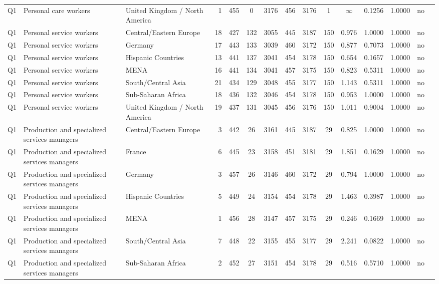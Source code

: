 \begin{longtable}{lllrcccccccccll}
Q1 & Personal care workers & United Kingdom / North America & 1 & 455 & 0 & 3176 & 456 & 3176 & 1 & $\infty$ & 0.1256 & 1.0000 & no \\
Q1 & Personal service workers & Central/Eastern Europe & 18 & 427 & 132 & 3055 & 445 & 3187 & 150 & 0.976 & 1.0000 & 1.0000 & no \\
Q1 & Personal service workers & Germany & 17 & 443 & 133 & 3039 & 460 & 3172 & 150 & 0.877 & 0.7073 & 1.0000 & no \\
Q1 & Personal service workers & Hispanic Countries & 13 & 441 & 137 & 3041 & 454 & 3178 & 150 & 0.654 & 0.1657 & 1.0000 & no \\
Q1 & Personal service workers & MENA & 16 & 441 & 134 & 3041 & 457 & 3175 & 150 & 0.823 & 0.5311 & 1.0000 & no \\
Q1 & Personal service workers & South/Central Asia & 21 & 434 & 129 & 3048 & 455 & 3177 & 150 & 1.143 & 0.5311 & 1.0000 & no \\
Q1 & Personal service workers & Sub-Saharan Africa & 18 & 436 & 132 & 3046 & 454 & 3178 & 150 & 0.953 & 1.0000 & 1.0000 & no \\
Q1 & Personal service workers & United Kingdom / North America & 19 & 437 & 131 & 3045 & 456 & 3176 & 150 & 1.011 & 0.9004 & 1.0000 & no \\
Q1 & Production and specialized services managers & Central/Eastern Europe & 3 & 442 & 26 & 3161 & 445 & 3187 & 29 & 0.825 & 1.0000 & 1.0000 & no \\
Q1 & Production and specialized services managers & France & 6 & 445 & 23 & 3158 & 451 & 3181 & 29 & 1.851 & 0.1629 & 1.0000 & no \\
Q1 & Production and specialized services managers & Germany & 3 & 457 & 26 & 3146 & 460 & 3172 & 29 & 0.794 & 1.0000 & 1.0000 & no \\
Q1 & Production and specialized services managers & Hispanic Countries & 5 & 449 & 24 & 3154 & 454 & 3178 & 29 & 1.463 & 0.3987 & 1.0000 & no \\
Q1 & Production and specialized services managers & MENA & 1 & 456 & 28 & 3147 & 457 & 3175 & 29 & 0.246 & 0.1669 & 1.0000 & no \\
Q1 & Production and specialized services managers & South/Central Asia & 7 & 448 & 22 & 3155 & 455 & 3177 & 29 & 2.241 & 0.0822 & 1.0000 & no \\
Q1 & Production and specialized services managers & Sub-Saharan Africa & 2 & 452 & 27 & 3151 & 454 & 3178 & 29 & 0.516 & 0.5710 & 1.0000 & no \\

\end{longtable}
